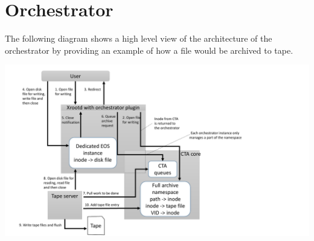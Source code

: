 \documentclass{article}
\begin{document}
\newpage
\section{Orchestrator}
The following diagram shows a high level view of the architecture of the orchestrator by providing an example of how a file would be archived to tape.

\includegraphics[width=\linewidth]{CTA_orchestrator}
\end{document}
